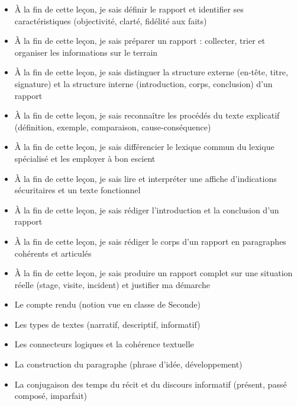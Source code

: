 \documentclass[11pt]{article}
\begin{document}
\begin{objectifs}
\begin{itemize}
\item À la fin de cette leçon, je sais définir le rapport et identifier ses caractéristiques (objectivité, clarté, fidélité aux faits)
\item À la fin de cette leçon, je sais préparer un rapport : collecter, trier et organiser les informations sur le terrain
\item À la fin de cette leçon, je sais distinguer la structure externe (en-tête, titre, signature) et la structure interne (introduction, corps, conclusion) d'un rapport
\item À la fin de cette leçon, je sais reconnaître les procédés du texte explicatif (définition, exemple, comparaison, cause-conséquence)
\item À la fin de cette leçon, je sais différencier le lexique commun du lexique spécialisé et les employer à bon escient
\item À la fin de cette leçon, je sais lire et interpréter une affiche d'indications sécuritaires et un texte fonctionnel
\item À la fin de cette leçon, je sais rédiger l'introduction et la conclusion d'un rapport
\item À la fin de cette leçon, je sais rédiger le corps d'un rapport en paragraphes cohérents et articulés
\item À la fin de cette leçon, je sais produire un rapport complet sur une situation réelle (stage, visite, incident) et justifier ma démarche
\end{itemize}
\end{objectifs}

\begin{prerequis}
\begin{itemize}
\item Le compte rendu (notion vue en classe de Seconde)
\item Les types de textes (narratif, descriptif, informatif)
\item Les connecteurs logiques et la cohérence textuelle
\item La construction du paragraphe (phrase d'idée, développement)
\item La conjugaison des temps du récit et du discours informatif (présent, passé composé, imparfait)
\end{itemize}
\end{prerequis}

\newpage
\end{document}
